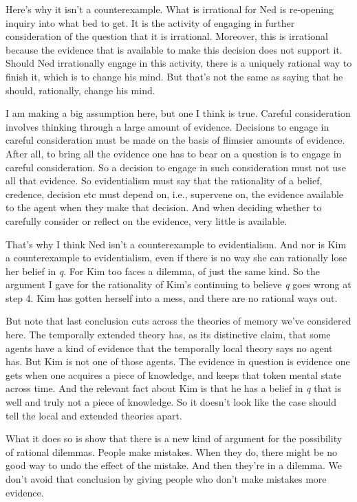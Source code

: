 \documentclass[
  10pt,
  letterpaper,
  DIV=11,
  numbers=noendperiod,
  twoside]{scrartcl}
\begin{document}
Here's why it isn't a counterexample. What is irrational for Ned is
re-opening inquiry into what bed to get. It is the activity of engaging
in further consideration of the question that it is irrational.
Moreover, this is irrational because the evidence that is available to
make this decision does not support it. Should Ned irrationally engage
in this activity, there is a uniquely rational way to finish it, which
is to change his mind. But that's not the same as saying that he should,
rationally, change his mind.

I am making a big assumption here, but one I think is true. Careful
consideration involves thinking through a large amount of evidence.
Decisions to engage in careful consideration must be made on the basis
of flimsier amounts of evidence. After all, to bring all the evidence
one has to bear on a question is to engage in careful consideration. So
a decision to engage in such consideration must not use all that
evidence. So evidentialism must say that the rationality of a belief,
credence, decision etc must depend on, i.e., supervene on, the evidence
available to the agent when they make that decision. And when deciding
whether to carefully consider or reflect on the evidence, very little is
available.

That's why I think Ned isn't a counterexample to evidentialism. And nor
is Kim a counterexample to evidentialism, even if there is no way she
can rationally lose her belief in \emph{q}. For Kim too faces a dilemma,
of just the same kind. So the argument I gave for the rationality of
Kim's continuing to believe \emph{q} goes wrong at step 4. Kim has
gotten herself into a mess, and there are no rational ways out.

But note that last conclusion cuts across the theories of memory we've
considered here. The temporally extended theory has, as its distinctive
claim, that some agents have a kind of evidence that the temporally
local theory says no agent has. But Kim is not one of those agents. The
evidence in question is evidence one gets when one acquires a piece of
knowledge, and keeps that token mental state across time. And the
relevant fact about Kim is that he has a belief in \emph{q} that is well
and truly not a piece of knowledge. So it doesn't look like the case
should tell the local and extended theories apart.

What it does so is show that there is a new kind of argument for the
possibility of rational dilemmas. People make mistakes. When they do,
there might be no good way to undo the effect of the mistake. And then
they're in a dilemma. We don't avoid that conclusion by giving people
who don't make mistakes more evidence.
\end{document}

